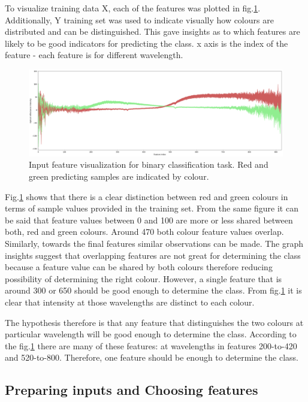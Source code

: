 \documentclass[11pt]{article}
\begin{document}
			To visualize training data X, each of the features was plotted in fig.\ref{fig:binary}. Additionally, Y training set was used to indicate visually how colours are distributed and can be distinguished. This gave insights as to which features are likely to be good indicators for predicting the class. x axis is the index of the feature - each feature is for different wavelength. 

			\begin{figure}[H]
				\includegraphics[width=1\textwidth]{png/binary_default}
				\caption{Input feature visualization for binary classification task. Red and green predicting samples are indicated by colour.}
				\label{fig:binary}
			\end{figure}

			Fig.\ref{fig:binary} shows that there is a clear distinction between red and green colours in terms of sample values provided in the training set. From the same figure it can be said that feature values between 0 and 100 are more or less shared between both, red and green colours. Around 470 both colour feature values overlap. Similarly, towards the final features similar observations can be made. The graph insights suggest that overlapping features are not great for determining the class because a feature value can be shared by both colours therefore reducing possibility of determining the right colour. However, a single feature that is around 300 or 650 should be good enough to determine the class. From fig.\ref{fig:binary} it is clear that intensity at those wavelengths are distinct to each colour.

			The hypothesis therefore is that any feature that distinguishes the two colours at particular wavelength will be good enough to determine the class. According to the fig.\ref{fig:binary} there are many of these features: at wavelengths in features 200-to-420 and 520-to-800. Therefore, one feature should be enough to determine the class.

		\subsection{Preparing inputs and Choosing features}
\end{document}
